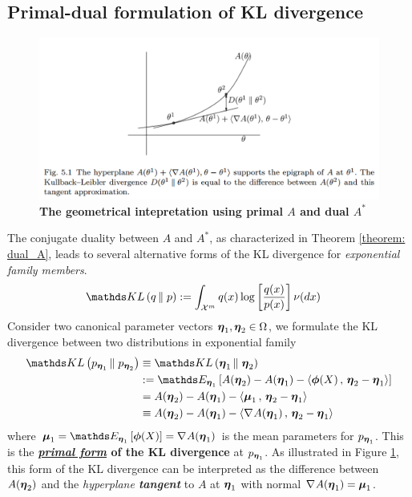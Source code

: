 \documentclass[11pt]{article}
\begin{document}
\subsection{Primal-dual formulation of KL divergence}
\begin{figure}
\begin{minipage}[t]{1\linewidth}
  \centering
  \centerline{\includegraphics[scale = 0.4]{kl_divg_geo.png}}
\end{minipage}
\caption{\footnotesize{\textbf{The geometrical intepretation using primal $A$ and dual $A^{*}$}}}
\label{fig: kl_divg_geo}
\end{figure}

The conjugate duality between $A$ and $A^{*}$, as characterized in Theorem \eqref{theorem: dual_A}, leads to several alternative forms of the KL divergence for
\emph{exponential family members}.
\begin{align*}
\kl{q}{p} &:= \int_{\cX^{m}} q(x) \log\brac{\frac{q(x)}{p(x)}} \nu(dx)
\end{align*} Consider two canonical parameter vectors $\boldsymbol{\eta}_1, \boldsymbol{\eta}_2 \in \Omega$, we formulate the KL divergence between two distributions in exponential family
\begin{align}
\kl{p_{\mb{\eta}_1}}{p_{\mb{\eta}_2}} &\equiv  \kl{\mb{\eta}_1}{\mb{\eta}_2}\nonumber\\
&:= \E{\mb{\eta}_1}{A(\mb{\eta}_2) - A(\mb{\eta}_1)  -\inn{\mb{\phi}(X)}{\mb{\eta}_2 - \mb{\eta}_1} } \nonumber\\
&=  A(\mb{\eta}_2) - A(\mb{\eta}_1) -  \inn{\mb{\mu}_{1}}{\mb{\eta}_2 - \mb{\eta}_1}  \label{eqn: kl_primal}\\
&\equiv  A(\mb{\eta}_2) - A(\mb{\eta}_1) -  \inn{\grad{}{A}(\mb{\eta}_1)}{\mb{\eta}_2 - \mb{\eta}_1}  \nonumber
\end{align} where $\mb{\mu}_{1} = \E{\mb{\eta}_1}{\mb{\phi}(X)} = \grad{}{A}(\mb{\eta}_1)$ is the mean parameters for $p_{\boldsymbol{\eta}_1}$. This is the \textbf{\underline{\emph{primal form}} of the KL divergence} at $p_{\boldsymbol{\eta}_1}$. As illustrated in Figure \ref{fig: kl_divg_geo}, this form of the KL divergence can be
interpreted as the difference between $A(\boldsymbol{\eta}_2)$ and the \emph{hyperplane \textbf{tangent}} to $A$ at $\boldsymbol{\eta}_1$ with normal $\nabla_{}{A}(\boldsymbol{\eta}_1) = \boldsymbol{\mu}_{1}$. 
\end{document}
